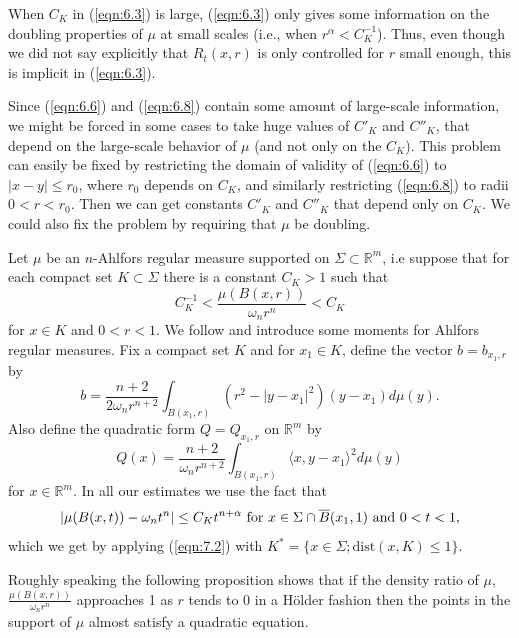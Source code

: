 \documentclass[12pt,leqno]{article}
\newcommand{\RR}{\mathbb{R}}
\newcommand{\dist}{\mathrm{dist}}
\theoremstyle{plain}
\numberwithin{equation}{section}
\begin{document}
\begin{rem}\label{rem:6.9}
When $C_K$ in (\ref{eqn:6.3}) is  large, (\ref{eqn:6.3}) only gives some
information on the doubling properties of $\mu$ at small scales (i.e., when
$r^\alpha<C^{-1}_K$). Thus, even though we did not say explicitly that
$R_t(x,r)$ is only controlled for $r$ small enough, this is implicit in
(\ref{eqn:6.3}).

Since (\ref{eqn:6.6}) and (\ref{eqn:6.8}) contain some amount of large-scale
information, we might be forced in some cases to take huge values of $C'_K$
and $C''_K$, that depend on the large-scale behavior of $\mu$ (and not
only on the $C_K$). This problem can easily be fixed by restricting the
domain of validity of (\ref{eqn:6.6}) to $|x-y|\le r_0$, where $r_0$ depends
on $C_K$, and similarly restricting (\ref{eqn:6.8}) to radii $0<r<r_0$. Then
we can get constants $C'_K$ and $C''_K$ that depend only on $C_K$. We could
also fix the problem by requiring that $\mu$ be doubling.
\end{rem}


\noindent
Let $\mu$ be an $n$-Ahlfors regular measure supported on $\Sigma\subset\RR^m$,
i.e suppose that
for each compact set $K\subset\Sigma$ there is
a constant $C_K>1$ such that
\begin{equation}\label{eqn:7.2A}
C_K^{-1}<\frac{\mu(B(x,r))}{\omega_nr^n}<C_K
\end{equation}
for $x\in K$ and $0<r<1$.
We follow \cite{KoP} and introduce some moments for Ahlfors regular measures.
Fix a compact set $K$ and for $x_1\in K$, define the vector $b=b_{x_1,r}$ by
\begin{equation}\label{eqn:7.3}
b=\frac{n+2}{2\omega_nr^{n+2}}\int_{B(x_1,r)}(r^2-|y-x_1|^2)(y-x_1)d\mu(y).
\end{equation}
Also define the quadratic form $Q=Q_{x_1,r}$ on $\RR^{m}$ by
\begin{equation}\label{eqn:7.4}
Q(x)=\frac{n+2}{\omega_nr^{n+2}}\int_{B(x_1,r)}\langle x, y-x_1\rangle^2d\mu(y)
\end{equation}
for $x\in\RR^{m}$.
In all our estimates we use the fact that
\begin{equation}\label{eqn:7.5}
|\mu(B(x,t))-\omega_nt^n|\le C_Kt^{n+\alpha}\hbox{ for }x\in\Sigma\cap\overline
B(x_1,1)\hbox{ and }0<t<1,
\end{equation}
which we get by applying (\ref{eqn:7.2}) with $K^\ast=\{x\in\Sigma;
\dist(x,K)\le 1\}$.



Roughly speaking the following proposition shows that if the density
ratio of $\mu$,
$\frac{\mu(B(x,r))}{\omega_nr^n}$ approaches 1 as $r$ tends to 0 in a
H\"older fashion then the points in the support of $\mu$ almost satisfy
a quadratic equation.
\end{document}
